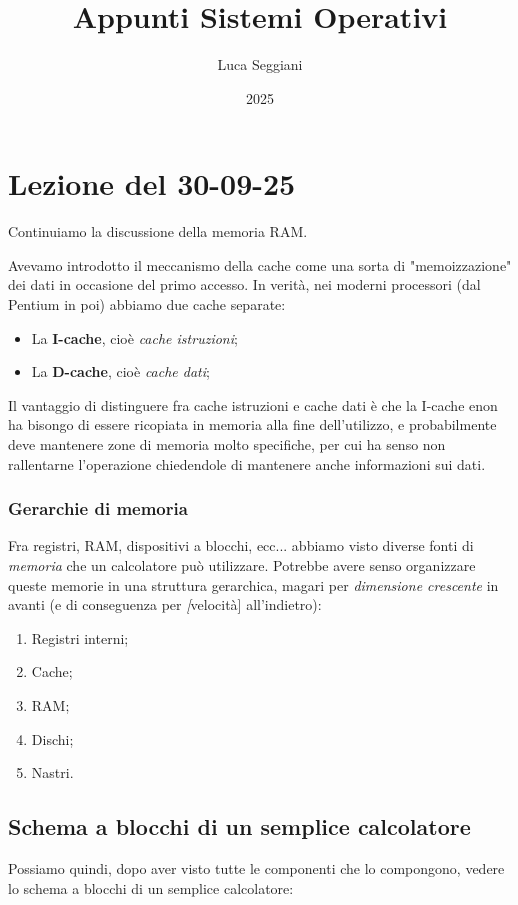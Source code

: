 \documentclass[a4paper,11pt]{article}
\title{Appunti Sistemi Operativi}
\author{Luca Seggiani}
\date{2025}
\begin{document}
\section{Lezione del 30-09-25}

\thispagestyle{empty}
\pagestyle{fancy}

Continuiamo la discussione della memoria RAM.

Avevamo introdotto il meccanismo della cache come una sorta di "memoizzazione" dei dati in occasione del primo accesso.
In verità, nei moderni processori (dal Pentium in poi) abbiamo due cache separate:
\begin{itemize}
	\item La \textbf{I-cache}, cioè \textit{cache istruzioni};
	\item La \textbf{D-cache}, cioè \textit{cache dati};
\end{itemize}

Il vantaggio di distinguere fra cache istruzioni e cache dati è che la I-cache enon ha bisongo di essere ricopiata in memoria alla fine dell'utilizzo, e probabilmente deve mantenere zone di memoria molto specifiche, per cui ha senso non rallentarne l'operazione chiedendole di mantenere anche informazioni sui dati.

\subsubsection{Gerarchie di memoria}
Fra registri, RAM, dispositivi a blocchi, ecc... abbiamo visto diverse fonti di \textit{memoria} che un calcolatore può utilizzare. Potrebbe avere senso organizzare queste memorie in una struttura gerarchica, magari per \textit{dimensione crescente} in avanti (e di conseguenza per \textit[velocità] all'indietro):
\begin{enumerate}
	\item Registri interni;
	\item Cache;
	\item RAM;
	\item Dischi;
	\item Nastri.
\end{enumerate}

\subsection{Schema a blocchi di un semplice calcolatore}
Possiamo quindi, dopo aver visto tutte le componenti che lo compongono, vedere lo schema a blocchi di un semplice calcolatore: 
\end{document}

